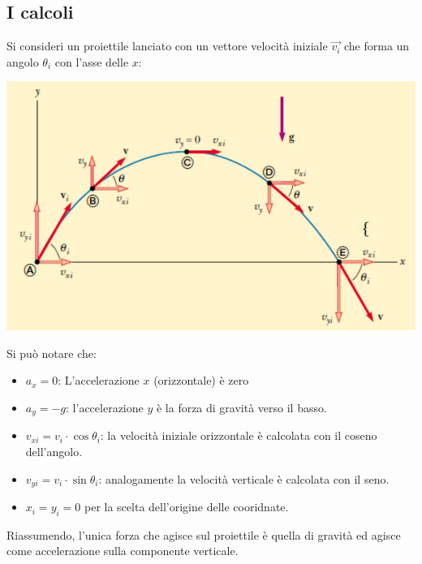 \documentclass[12pt, a4paper, openany]{book}
\begin{document}
\subsection{I calcoli}
Si consideri un proiettile lanciato con un vettore velocità iniziale $\overrightarrow{v_i}$ che forma un angolo $\theta_i$ con l'asse delle $x$:
\begin{center}
    \includegraphics[width=\textwidth]{lez2slide19.png}
\end{center}
Si può notare che:
\begin{itemize}
    \item $a_x=0$: L'accelerazione $x$ (orizzontale) è zero
    \item $a_y= -g$: l'accelerazione $y$ è la forza di gravità verso il basso.
    \item $v_{xi} = v_i \cdot \cos \theta_i$: la velocità iniziale orizzontale è calcolata con il coseno dell'angolo.
    \item $v_{yi} = v_i \cdot \sin \theta_i$: analogamente la velocità verticale è calcolata con il seno.
    \item $x_i=y_i=0$ per la scelta dell'origine delle cooridnate.
\end{itemize}
Riassumendo, l'unica forza che agisce sul proiettile è quella di gravità ed agisce come accelerazione sulla componente verticale.
\end{document}
